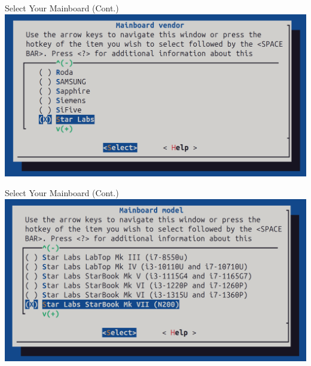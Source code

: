 \documentclass{beamer}
\begin{document}
	\begin{frame}{Select Your Mainboard (Cont.)}
		\centering
		\includegraphics[width=1\linewidth]{images/img3}
	\end{frame}
	
	
	
	\begin{frame}{Select Your Mainboard (Cont.)}
		\centering
		\includegraphics[width=1\linewidth]{images/img4}
	\end{frame}
	
	
	
	
\end{document}
